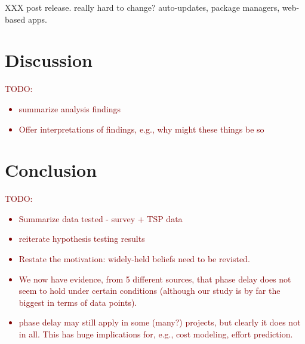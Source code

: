 \documentclass{sig-alternate}
\newcommand{\todo}[1]{\textcolor{Maroon}{TODO: #1}}
\newcommand{\bi}{\begin{itemize}[leftmargin=0.4cm]}
\newcommand{\ei}{\end{itemize}}
\begin{document}
XXX post release. really hard to change? auto-updates, package managers, web-based apps. 
 
 \section{Discussion}
 \todo{
 \bi
    \item summarize analysis findings
    \item Offer interpretations of findings, e.g., why might these things be so
 \ei
 }
 
 
 \section{Conclusion}
 \todo{
 \bi
    \item Summarize data tested - survey + TSP data
    \item reiterate hypothesis testing results
    \item Restate the motivation: widely-held beliefs need to be revisted. 
    \item We now have evidence, from 5 different sources, that phase delay does not seem to hold under certain conditions (although our study is by far the biggest in terms of data points).
    \item phase delay may still apply in some (many?) projects, but clearly it does not in all. This has huge implications for, e.g., cost modeling, effort prediction.
 \ei
 }
 
\end{document}
